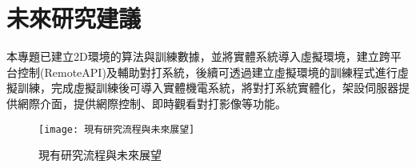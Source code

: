 \chapter{未來研究建議}
本專題已建立2D環境的算法與訓練數據，並將實體系統導入虛擬環境，建立跨平台控制(RemoteAPI)及輔助對打系統，後續可透過建立虛擬環境的訓練程式進行虛擬訓練，完成虛擬訓練後可導入實體機電系統，將對打系統實體化，架設伺服器提供網際介面，提供網際控制、即時觀看對打影像等功能。
\begin{figure}[hbt!]
\begin{center}
\texttt{[image: 現有研究流程與未來展望]}
\caption{\Large 現有研究流程與未來展望}
\label{fig.現有研究流程與未來展望}
\end{center}
\end{figure}
